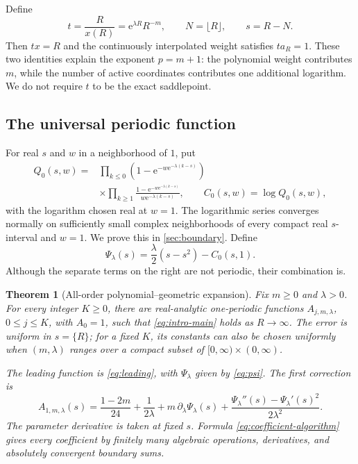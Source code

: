\documentclass[11pt,a4paper]{article}
\numberwithin{equation}{section}
\newtheorem{theorem}{Theorem}[section]
\theoremstyle{definition}
\newcommand{\ee}{\mathrm e}
\begin{document}
Define
\begin{equation}
 t=\frac R{x(R)}=\ee^{\lambda R}R^{-m},\qquad
 N=\lfloor R\rfloor,\qquad s=R-N.
 \label{eq:scaling}
\end{equation}
Then $tx=R$ and the continuously interpolated weight satisfies $t a_R=1$. These two identities explain the exponent $p=m+1$: the polynomial weight contributes $m$, while the number of active coordinates contributes one additional logarithm. We do not require $t$ to be the exact saddlepoint.

\subsection{The universal periodic function}
For real $s$ and $w$ in a neighborhood of $1$, put
\begin{equation}
\begin{split}
 Q_0(s,w)={}&
 \prod_{k\leq0}\left(1-\ee^{-w\ee^{-\lambda(k-s)}}\right)\\
 &\times\prod_{k\geq1}
 \frac{1-\ee^{-w\ee^{-\lambda(k-s)}}}{w\ee^{-\lambda(k-s)}},
 \qquad C_0(s,w)=\log Q_0(s,w),
\end{split}
\label{eq:Q0}
\end{equation}
with the logarithm chosen real at $w=1$. The logarithmic series converges normally on sufficiently small complex neighborhoods of every compact real $s$-interval and $w=1$. We prove this in \cref{sec:boundary}. Define
\begin{equation}
 \Psi_\lambda(s)=\frac\lambda2(s-s^2)-C_0(s,1).
 \label{eq:psi}
\end{equation}
Although the separate terms on the right are not periodic, their combination is.

\begin{theorem}[All-order polynomial--geometric expansion]
\label{thm:allorders}
Fix $m\geq0$ and $\lambda>0$. For every integer $K\geq0$, there are real-analytic one-periodic functions $A_{j,m,\lambda}$, $0\leq j\leq K$, with $A_0=1$, such that \eqref{eq:intro-main} holds as $R\to\infty$. The error is uniform in $s=\{R\}$; for a fixed $K$, its constants can also be chosen uniformly when $(m,\lambda)$ ranges over a compact subset of $[0,\infty)\times(0,\infty)$.

The leading function is \eqref{eq:leading}, with $\Psi_\lambda$ given by \eqref{eq:psi}. The first correction is
\begin{equation}
\boxed{\displaystyle
 A_{1,m,\lambda}(s)
 =\frac{1-2m}{24}+\frac1{2\lambda}
   +m\,\partial_\lambda\Psi_\lambda(s)
   +\frac{\Psi_\lambda''(s)-\Psi_\lambda'(s)^2}{2\lambda^2}.}
 \label{eq:A1}
\end{equation}
The parameter derivative is taken at fixed $s$. Formula \eqref{eq:coefficient-algorithm} gives every coefficient by finitely many algebraic operations, derivatives, and absolutely convergent boundary sums.
\end{theorem}
\end{document}
